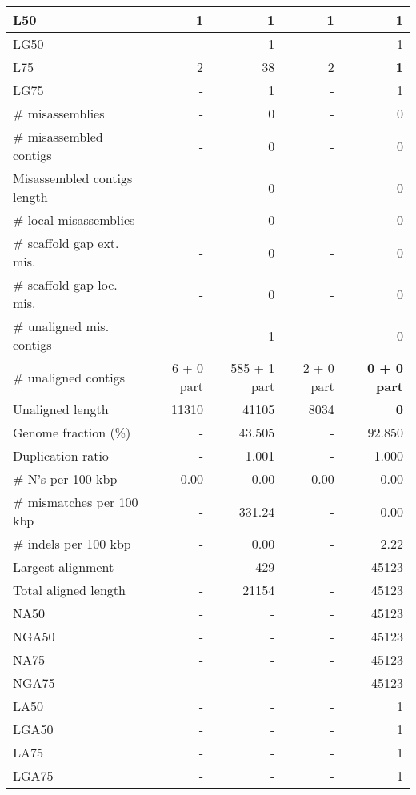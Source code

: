 \documentclass[12pt,a4paper]{article}
\begin{document}
\begin{table}[ht]
\begin{center}
\begin{tabular}{|l*{4}{|r}|}
L50 & 1 & 1 & 1 & 1 \\ \hline
LG50 & - & 1 & - & 1 \\ \hline
L75 & 2 & 38 & 2 & {\bf 1} \\ \hline
LG75 & - & 1 & - & 1 \\ \hline
\# misassemblies & - & 0 & - & 0 \\ \hline
\# misassembled contigs & - & 0 & - & 0 \\ \hline
Misassembled contigs length & - & 0 & - & 0 \\ \hline
\# local misassemblies & - & 0 & - & 0 \\ \hline
\# scaffold gap ext. mis. & - & 0 & - & 0 \\ \hline
\# scaffold gap loc. mis. & - & 0 & - & 0 \\ \hline
\# unaligned mis. contigs & - & 1 & - & 0 \\ \hline
\# unaligned contigs & 6 + 0 part & 585 + 1 part & 2 + 0 part & {\bf 0 + 0 part} \\ \hline
Unaligned length & 11310 & 41105 & 8034 & {\bf 0} \\ \hline
Genome fraction (\%) & - & 43.505 & - & 92.850 \\ \hline
Duplication ratio & - & 1.001 & - & 1.000 \\ \hline
\# N's per 100 kbp & 0.00 & 0.00 & 0.00 & 0.00 \\ \hline
\# mismatches per 100 kbp & - & 331.24 & - & 0.00 \\ \hline
\# indels per 100 kbp & - & 0.00 & - & 2.22 \\ \hline
Largest alignment & - & 429 & - & 45123 \\ \hline
Total aligned length & - & 21154 & - & 45123 \\ \hline
NA50 & - & - & - & 45123 \\ \hline
NGA50 & - & - & - & 45123 \\ \hline
NA75 & - & - & - & 45123 \\ \hline
NGA75 & - & - & - & 45123 \\ \hline
LA50 & - & - & - & 1 \\ \hline
LGA50 & - & - & - & 1 \\ \hline
LA75 & - & - & - & 1 \\ \hline
LGA75 & - & - & - & 1 \\ \hline
\end{tabular}
\end{center}
\end{table}
\end{document}
